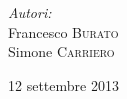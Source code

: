 \documentclass[12pt]{article} %
\begin{document}
\begin{titlepage}

\begin{center}
  \emph{Autori:}\\
  Francesco \textsc{Burato}\\
  Simone \textsc{Carriero}\\[2cm]
\end{center}
{\large 12 settembre 2013}\\[3cm] %


\vfill %

\end{titlepage}


\tableofcontents %

\newpage %



\newpage

\newpage



%
% 

\end{document}
